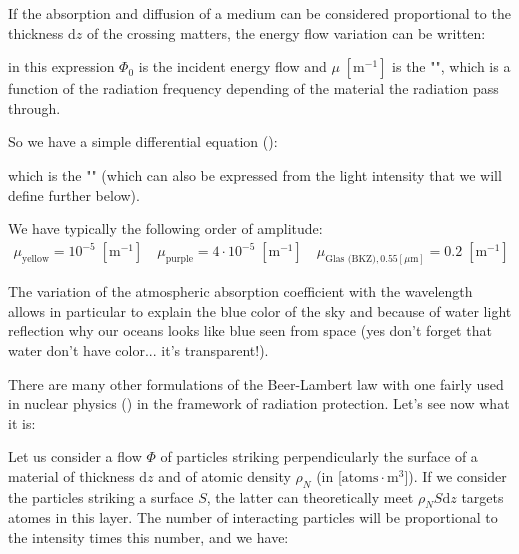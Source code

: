 	If the absorption and diffusion of a medium can be considered proportional to the thickness $\mathrm{d}z$ of the crossing matters, the energy flow variation can be written:
	
	in this expression $\Phi_0$ is the incident energy flow and $\mu\;[\text{m}^{-1}]$ is the "", which is a function of the radiation frequency depending of the material the radiation pass through.
	
	So we have a simple differential equation ():
	
	which is the "" (which can also be expressed from the light intensity that we will define further below).
	
	We have typically the following order of amplitude:
	\begin{gather*}
		\mu_{\text{yellow}}=10^{-5}\;[\text{m}^{-1}]\quad \mu_{\text{purple}}=4\cdot 10^{-5}\;[\text{m}^{-1}]\quad \mu_{\text{Glas (BKZ)},0.55 [\mu\text{m}]}=0.2\;[\text{m}^{-1}]
	\end{gather*}
	\begin{tcolorbox}[title=Remark,colframe=black,arc=10pt]
	The variation of the atmospheric absorption coefficient with the wavelength allows in particular to explain the blue color of the sky and because of water light reflection why our oceans looks like blue seen from space (yes don't forget that water don't have color... it's transparent!).
	\end{tcolorbox}
	There are many other formulations of the Beer-Lambert law with one fairly used in nuclear physics () in the framework of radiation protection. Let's see now what it is:
	
	Let us consider a flow $\Phi$ of particles striking perpendicularly the surface of a material of thickness $\mathrm{d}z$ and of atomic density $\rho_N$ (in [$\text{atoms}\cdot \text{m}^3$]). If we consider the particles striking a surface $S$, the latter can theoretically meet $\rho_NS\mathrm{d}z$ targets atomes in this layer. The number of interacting particles will be proportional to the intensity times this number, and we have:
	
